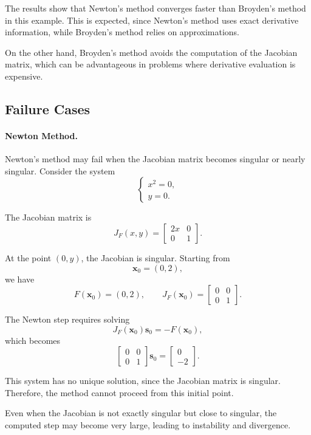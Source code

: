 The results show that Newton's method converges faster than Broyden's method in this example. This is expected, since Newton's method uses exact derivative information, while Broyden's method relies on approximations.

On the other hand, Broyden's method avoids the computation of the Jacobian matrix, which can be advantageous in problems where derivative evaluation is expensive.

\subsection{Failure Cases}

\paragraph{Newton Method.}
Newton's method may fail when the Jacobian matrix becomes singular or nearly singular. Consider the system
\begin{equation}
\begin{cases}
x^2 = 0, \\
y = 0.
\end{cases}
\end{equation}

The Jacobian matrix is
\[
J_F(x,y) =
\begin{bmatrix}
2x & 0 \\
0 & 1
\end{bmatrix}.
\]

At the point \( (0, y) \), the Jacobian is singular. Starting from
\[
\mathbf{x}_0 = (0, 2),
\]
we have
\[
F(\mathbf{x}_0) = (0, 2),
\qquad
J_F(\mathbf{x}_0) =
\begin{bmatrix}
0 & 0 \\
0 & 1
\end{bmatrix}.
\]

The Newton step requires solving
\[
J_F(\mathbf{x}_0)\mathbf{s}_0 = -F(\mathbf{x}_0),
\]
which becomes
\[
\begin{bmatrix}
0 & 0 \\
0 & 1
\end{bmatrix}
\mathbf{s}_0 =
\begin{bmatrix}
0 \\
-2
\end{bmatrix}.
\]

This system has no unique solution, since the Jacobian matrix is singular. Therefore, the method cannot proceed from this initial point.

Even when the Jacobian is not exactly singular but close to singular, the computed step may become very large, leading to instability and divergence.

